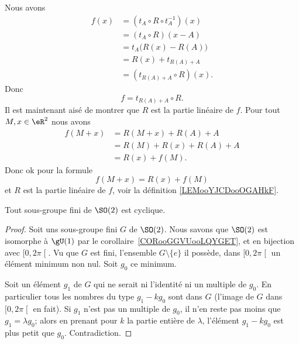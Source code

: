 \begin{example}
    Nous avons
    \begin{subequations}
        \begin{align}
            f(x)&=(t_A\circ R\circ t_A^{-1})(x)\\
            &=(t_A\circ R)(x-A)\\
            &=t_A\big( R(x)-R(A) \big)\\
            &=R(x)+t_{R(A)+A}\\
            &=(t_{R(A)+A}\circ R)(x).
        \end{align}
    \end{subequations}
    Donc 
    \begin{equation}
        f=t_{R(A)+A}\circ R.
    \end{equation}
    Il est maintenant aisé de montrer que \( R\) est la partie linéaire de \( f\). Pour tout \( M,x\in \eR^2\) nous avons
    \begin{subequations}
        \begin{align}
            f(M+x)&=R(M+x)+R(A)+A\\
            &=R(M)+R(x)+R(A)+A\\
            &=R(x)+f(M).
        \end{align}
    \end{subequations}
    Donc ok pour la formule
    \begin{equation}
        f(M+x)=R(x)+f(M)
    \end{equation}
    et \( R\) est la partie linéaire de \( f\), voir la définition \ref{LEMooYJCDooOGAHkF}.
\end{example}

\begin{lemma}        \label{LEMooUKEVooAEWvlM}
    Tout sous-groupe fini de \( \SO(2)\) est cyclique.
\end{lemma}

\begin{proof}
    Soit uns sous-groupe fini \(G\) de \( \SO(2)\).  Nous savons que \( \SO(2)\) est isomorphe à \( \gU(1)\) par le corollaire~\ref{CORooGGVUooLQYGET}, et en bijection avec \( \mathopen[ 0 , 2\pi \mathclose[\). Vu que \( G\) est fini, l'ensemble \( G\setminus\{ e \}\) il possède, dans \( \mathopen[ 0 , 2\pi \mathclose[\) un élément minimum non nul. Soit \( g_0\) ce minimum.

        Soit un élément \( g_1\) de \( G\) qui ne serait ni l'identité ni un multiple de \( g_0\). En particulier tous les nombres du type \( g_1-kg_0\) sont dans \( G\) (l'image de \( G\) dans \( \mathopen[ 0 , 2\pi \mathclose[\) en fait). Si \( g_1\) n'est pas un multiple de \( g_0\), il n'en reste pas moins que \( g_1=\lambda g_0\); alors en prenant pour \( k\) la partie entière de \( \lambda\), l'élément \( g_1-kg_0\) est plus petit que \( g_0\). Contradiction.
\end{proof}

